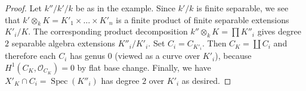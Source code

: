 \documentclass[10pt,a4paper]{amsart}
\theoremstyle{plain}
\theoremstyle{definition}
\theoremstyle{remark}
\numberwithin{equation}{subsection}
\def\Spec{\mathop{\mathrm{Spec}}}
\begin{document}
\begin{proof}
Let $k''/k'/k$ be as in the example.
Since $k'/k$ is finite separable, we see that
$k' \otimes_k K = K'_1 \times \ldots \times K'_n$
is a finite product of finite separable extensions $K'_i/K$.
The corresponding product decomposition
$k'' \otimes_k K = \prod K''_i$ gives degree $2$
separable algebra extensions $K''_i/K'_i$.
Set $C_i = C_{K'_i}$. Then $C_K = \coprod C_i$
and therefore each $C_i$ has genus $0$ (viewed as a curve
over $K'_i$), because $H^1(C_K, \mathcal{O}_{C_K}) = 0$
by flat base change.
Finally, we have $X'_K \cap C_i = \Spec(K''_i)$ has degree $2$
over $K'_i$ as desired.
\end{proof}
\end{document}
